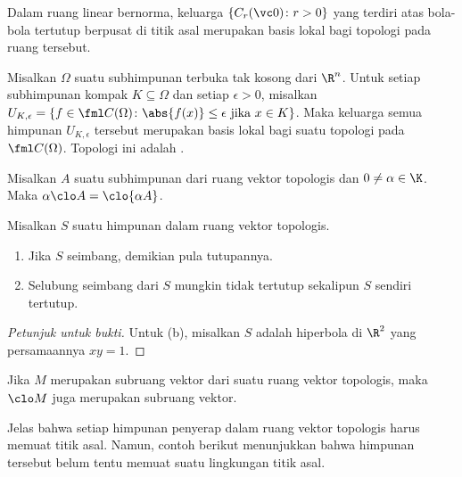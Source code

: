 \begin{exam} Dalam ruang linear bernorma, keluarga $\{C_r(\vc 0)\colon r > 0\}$ yang terdiri atas bola-bola tertutup berpusat di titik asal merupakan basis lokal bagi
topologi pada ruang tersebut.
\end{exam}

\begin{exam} Misalkan $\Omega$ suatu subhimpunan terbuka tak kosong dari $\R^n$.  Untuk setiap subhimpunan kompak $K \subseteq \Omega$ dan setiap $\epsilon > 0$, misalkan
$U_{K,\epsilon} = \{ f \in \fml C(\Omega)\colon \abs{f(x)} \le \epsilon \text{ jika } x \in K\}$.  Maka keluarga semua
himpunan $U_{K,\epsilon}$ tersebut merupakan basis lokal bagi suatu topologi pada~$\fml C(\Omega)$.  Topologi ini adalah
.
\end{exam}

\begin{prop} Misalkan $A$ suatu subhimpunan dari ruang vektor topologis dan $0 \ne \alpha \in \K$.  Maka $\alpha \clo A = \clo{\alpha A}$.
\end{prop}

\begin{prop} Misalkan $S$ suatu himpunan dalam ruang vektor topologis.
   \begin{enumerate}[label=\rm{(\alph*)}]
    \item Jika $S$ seimbang, demikian pula tutupannya.
    \item Selubung seimbang dari $S$ mungkin tidak tertutup sekalipun $S$ sendiri tertutup.
   \end{enumerate}
\end{prop}

\begin{proof}[\emph{Petunjuk untuk bukti}] Untuk (b), misalkan $S$ adalah hiperbola di $\R^2$ yang persamaannya $xy = 1$.  \ns
\end{proof}

\begin{prop} Jika $M$ merupakan subruang vektor dari suatu ruang vektor topologis, maka~$\clo M$ juga merupakan subruang vektor.
\end{prop}

Jelas bahwa setiap himpunan penyerap dalam ruang vektor topologis harus memuat titik asal.  Namun, contoh berikut menunjukkan bahwa
himpunan tersebut belum tentu memuat suatu lingkungan titik asal.

